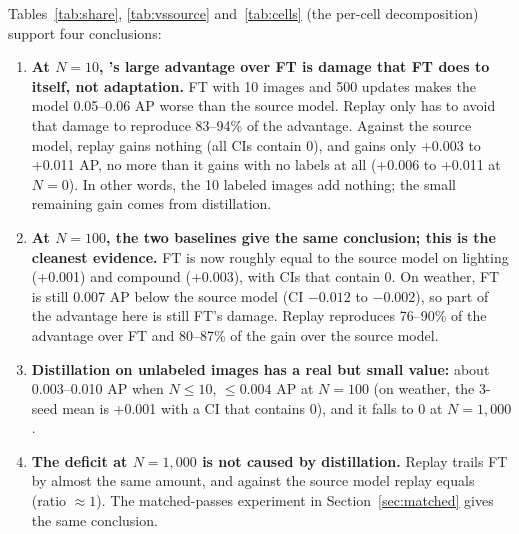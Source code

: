 Tables~\ref{tab:share}, \ref{tab:vssource} and~\ref{tab:cells} (the per-cell decomposition) support four conclusions:
\begin{enumerate}
\item \textbf{At $N = 10$, \aldi's large advantage over FT is damage that FT does to itself, not adaptation.} FT with 10 images and 500 updates makes the model 0.05--0.06 AP worse than the source model. Replay only has to avoid that damage to reproduce 83--94\% of the advantage. Against the source model, replay gains nothing (all CIs contain 0), and \aldi gains only +0.003 to +0.011 AP, no more than it gains with no labels at all (+0.006 to +0.011 at $N = 0$). In other words, the 10 labeled images add nothing; the small remaining gain comes from distillation.
\item \textbf{At $N = 100$, the two baselines give the same conclusion; this is the cleanest evidence.} FT is now roughly equal to the source model on lighting (+0.001) and compound (+0.003), with CIs that contain 0. On weather, FT is still 0.007 AP below the source model (CI $-0.012$ to $-0.002$), so part of the advantage here is still FT's damage. Replay reproduces 76--90\% of the advantage over FT and 80--87\% of the gain over the source model.
\item \textbf{Distillation on unlabeled images has a real but small value:} about 0.003--0.010 AP when $N \leq 10$, $\leq 0.004$ AP at $N = 100$ (on weather, the 3-seed mean is +0.001 with a CI that contains 0), and it falls to 0 at $N = 1{,}000$.
\item \textbf{The deficit at $N = 1{,}000$ is not caused by distillation.} Replay trails FT by almost the same amount, and against the source model replay equals \aldi (ratio $\approx 1$). The matched-passes experiment in Section~\ref{sec:matched} gives the same conclusion.
\end{enumerate}

